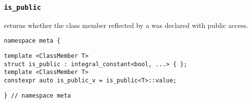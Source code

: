 

\subsubsection{\texttt{is\_public}}

returns whether the class member reflected by a  was declared with public access.

\begin{verbatim}
namespace meta {
\end{verbatim}
\begin{verbatim}
template <ClassMember T>
struct is_public : integral_constant<bool, ...> { };
template <ClassMember T>
constexpr auto is_public_v = is_public<T>::value;
\end{verbatim}
\begin{verbatim}
} // namespace meta
\end{verbatim}

